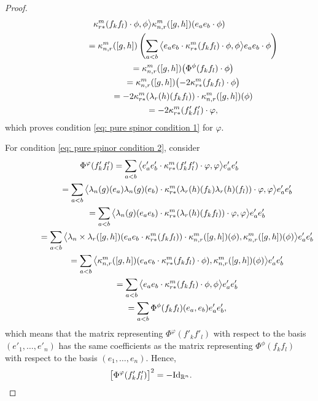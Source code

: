 \documentclass[10pt,a4paper]{amsart}
\numberwithin{equation}{section}
\begin{document}
\begin{proof}
{\begin{gather*}
\kappa_{r*}^m(f_kf_l)\cdot \phi,\phi\big\rangle
\kappa_{n,r}^m([g,h])(e_ae_b\cdot\phi)\\
\hphantom{\Phi^\varphi(f'_kf'_l) \cdot \varphi}{}
 = \kappa_{n,r}^m([g,h])\left(\sum_{a<b} \big\langle e_ae_b\cdot
\kappa_{r*}^m(f_kf_l)\cdot \phi,\phi\big\rangle
e_ae_b\cdot\phi\right)\\
\hphantom{\Phi^\varphi(f'_kf'_l) \cdot \varphi}{}
 = \kappa_{n,r}^m([g,h])\big(\Phi^\phi(f_kf_l)\cdot\phi\big)\\
 \hphantom{\Phi^\varphi(f'_kf'_l) \cdot \varphi}{}
 = \kappa_{n,r}^m([g,h])\big({-}2\kappa_{r*}^m(f_kf_l)\cdot\phi\big)\\
 \hphantom{\Phi^\varphi(f'_kf'_l) \cdot \varphi}{}
 = -2\kappa_{r*}^m(\lambda_r(h)(f_kf_l))\cdot\kappa_{n,r}^m([g,h])(\phi)\\
 \hphantom{\Phi^\varphi(f'_kf'_l) \cdot \varphi}{}
 = -2\kappa_{r*}^m(f'_kf'_l)\cdot\varphi,
\end{gather*}
which proves condition \eqref{eq: pure spinor condition 1} for $\varphi$.}

For condition \eqref{eq: pure spinor condition 2}, consider
\begin{gather*}
 \Phi^\varphi(f'_kf'_l) = \sum_{a<b} \big\langle e'_ae'_b\cdot \kappa_{r*}^m(f'_kf'_l)\cdot \varphi,\varphi\big\rangle e'_ae'_b\\
 \hphantom{\Phi^\varphi(f'_kf'_l)}{}= \sum_{a<b} \big\langle \lambda_n(g)(e_a)\lambda_n(g)(e_b)\cdot
\kappa_{r*}^m(\lambda_r(h)(f_k)\lambda_r(h)(f_l))\cdot \varphi,\varphi\big\rangle
e'_ae'_b\\
\hphantom{\Phi^\varphi(f'_kf'_l)}{} = \sum_{a<b} \big\langle \lambda_n(g)(e_ae_b)\cdot
\kappa_{r*}^m(\lambda_r(h)(f_kf_l))\cdot \varphi,\varphi\big\rangle e'_ae'_b\\
\hphantom{\Phi^\varphi(f'_kf'_l)}{} = \sum_{a<b} \big\langle \lambda_n\times\lambda_r([g,h])(e_ae_b\cdot
\kappa_{r*}^m(f_kf_l))\cdot \kappa_{n,r}^m([g,h])(\phi),\kappa_{n,r}^m([g,h])(\phi)\big\rangle e'_ae'_b\\
\hphantom{\Phi^\varphi(f'_kf'_l)}{} = \sum_{a<b} \big\langle \kappa_{n,r}^m([g,h])(e_ae_b\cdot
\kappa_{r*}^m(f_kf_l)\cdot \phi),\kappa_{n,r}^m([g,h])(\phi)\big\rangle e'_ae'_b\\
\hphantom{\Phi^\varphi(f'_kf'_l)}{} = \sum_{a<b} \big\langle e_ae_b\cdot \kappa_{r*}^m(f_kf_l)\cdot \phi,\phi\big\rangle e'_ae'_b\\
\hphantom{\Phi^\varphi(f'_kf'_l)}{} = \sum_{a<b} \Phi^\phi(f_kf_l)(e_a,e_b) e'_ae'_b,
\end{gather*}
which means that the matrix representing $\Phi^\varphi(f'_kf'_l)$ with respect to the basis $(e'_1,\dots,e'_n)$ has the same coefficients as the matrix representing $\Phi^\phi(f_kf_l)$ with respect to the basis $(e_1,\dots,e_n)$. Hence,
\begin{gather*}\big[\Phi^\varphi(f'_kf'_l)\big]^2=-{\rm Id}_{\mathbb{R}^n}.\tag*{\qed}\end{gather*}\renewcommand{\qed}{}
\end{proof}
\end{document}

